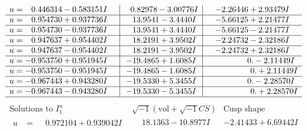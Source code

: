 \documentclass[1p]{elsarticle_modified}
\theoremstyle{definition}
\newcommand{\I}{\sqrt{-1}}
\begin{document}
$$\begin{array}{c|c|c}
\begin{aligned}
u &= \phantom{-}0.446314 - 0.583151 I\end{aligned}
 & \phantom{-}0.82978 - 3.00776 I & -2.26446 + 2.93479 I \\ \hline\begin{aligned}
u &= \phantom{-}0.954730 + 0.937736 I\end{aligned}
 & \phantom{-}13.9541 - 3.4440 I & -5.66125 + 2.21477 I \\ \hline\begin{aligned}
u &= \phantom{-}0.954730 - 0.937736 I\end{aligned}
 & \phantom{-}13.9541 + 3.4440 I & -5.66125 - 2.21477 I \\ \hline\begin{aligned}
u &= \phantom{-}0.947637 + 0.954402 I\end{aligned}
 & \phantom{-}18.2191 + 3.9502 I & -2.24732 - 2.32186 I \\ \hline\begin{aligned}
u &= \phantom{-}0.947637 - 0.954402 I\end{aligned}
 & \phantom{-}18.2191 - 3.9502 I & -2.24732 + 2.32186 I \\ \hline\begin{aligned}
u &= -0.953750 + 0.951945 I\end{aligned}
 & -19.4865 + 1.6085 I & \phantom{-0.000000 } 0. - 2.11449 I \\ \hline\begin{aligned}
u &= -0.953750 - 0.951945 I\end{aligned}
 & -19.4865 - 1.6085 I & \phantom{-0.000000 -}0. + 2.11449 I \\ \hline\begin{aligned}
u &= -0.967443 + 0.943280 I\end{aligned}
 & -19.5330 + 5.3455 I & \phantom{-0.000000 } 0. - 2.28570 I \\ \hline\begin{aligned}
u &= -0.967443 - 0.943280 I\end{aligned}
 & -19.5330 - 5.3455 I & \phantom{-0.000000 -}0. + 2.28570 I\\
 \hline 
 \end{array}$$\newpage$$\begin{array}{c|c|c}  
\text{Solutions to }I^u_{1}& \I (\text{vol} + \sqrt{-1}CS) & \text{Cusp shape}\\
 \hline 
\begin{aligned}
u &= \phantom{-}0.972104 + 0.939042 I\end{aligned}
 & \phantom{-}18.1363 - 10.8977 I & -2.41433 + 6.69442 I \\ \hline\begin{aligned}

\end{aligned}
\end{array}$$
\end{document}
